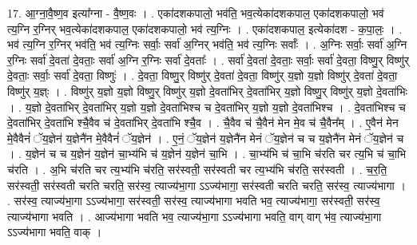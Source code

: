 \documentclass[17pt]{extarticle}
\begin{document}
17. आ॒ग्ना॒वै॒ष्ण॒व इत्या᳚ग्ना - वै॒ष्ण॒वः । . एका॑दशकपालो॒ भव॑ति॒ भव॒त्येका॑दशकपाल॒ एका॑दशकपालो॒ भव॑ त्य॒ग्नि र॒ग्निर् भव॒त्येका॑दशकपाल॒ एका॑दशकपालो॒ भव॑ त्य॒ग्निः । . एका॑दशकपाल॒ इत्येका॑दश - क॒पा॒लः॒ । . भव॑ त्य॒ग्नि र॒ग्निर् भव॑ति॒ भव॑ त्य॒ग्निः सर्वाः॒ सर्वा॑ अ॒ग्निर् भव॑ति॒ भव॑ त्य॒ग्निः सर्वाः᳚ । . अ॒ग्निः सर्वाः॒ सर्वा॑ अ॒ग्नि र॒ग्निः सर्वा॑ दे॒वता॑ दे॒वताः॒ सर्वा॑ अ॒ग्नि र॒ग्निः सर्वा॑ दे॒वताः᳚ । . सर्वा॑ दे॒वता॑ दे॒वताः॒ सर्वाः॒ सर्वा॑ दे॒वता॒ विष्णु॒र् विष्णु॑र् दे॒वताः॒ सर्वाः॒ सर्वा॑ दे॒वता॒ विष्णुः॑ । . दे॒वता॒ विष्णु॒र् विष्णु॑र् दे॒वता॑ दे॒वता॒ विष्णु॑र् य॒ज्ञो य॒ज्ञो विष्णु॑र् दे॒वता॑ दे॒वता॒ विष्णु॑र् य॒ज्ञ्ः । . विष्णु॑र् य॒ज्ञो य॒ज्ञो विष्णु॒र् विष्णु॑र् य॒ज्ञो दे॒वता॑भिर् दे॒वता॑भिर् य॒ज्ञो विष्णु॒र् विष्णु॑र् य॒ज्ञो दे॒वता॑भिः । . य॒ज्ञो दे॒वता॑भिर् दे॒वता॑भिर् य॒ज्ञो य॒ज्ञो दे॒वता॑भिश्च च दे॒वता॑भिर् य॒ज्ञो य॒ज्ञो दे॒वता॑भिश्च । . दे॒वता॑भिश्च च दे॒वता॑भिर् दे॒वता॑भि श्चै॒वैव च॑ दे॒वता॑भिर् दे॒वता॑भि श्चै॒व । . चै॒वैव च॑ चै॒वैन॑ मेन मे॒व च॑ चै॒वैन᳚म् । . ए॒वैन॑ मेन मे॒वैवैनं॑ ॅय॒ज्ञेन॑ य॒ज्ञेनै॑न मे॒वैवैनं॑ ॅय॒ज्ञेन॑ । . ए॒नं॒ ॅय॒ज्ञेन॑ य॒ज्ञेनै॑न मेनं ॅय॒ज्ञेन॑ च च य॒ज्ञेनै॑न मेनं ॅय॒ज्ञेन॑ च । . य॒ज्ञेन॑ च च य॒ज्ञेन॑ य॒ज्ञेन॑ चा॒भ्य॑भि च॑ य॒ज्ञेन॑ य॒ज्ञेन॑ चा॒भि । . चा॒भ्य॑भि च॑ चा॒भि च॑रति चर त्य॒भि च॑ चा॒भि च॑रति । . अ॒भि च॑रति चर त्य॒भ्य॑भि च॑रति॒ सर॑स्वती॒ सर॑स्वती चर त्य॒भ्य॑भि च॑रति॒ सर॑स्वती । . च॒र॒ति॒ सर॑स्वती॒ सर॑स्वती चरति चरति॒ सर॑स्व॒ त्याज्य॑भा॒गा ऽऽज्य॑भागा॒ सर॑स्वती चरति चरति॒ सर॑स्व॒ त्याज्य॑भागा । . सर॑स्व॒ त्याज्य॑भा॒गा ऽऽज्य॑भागा॒ सर॑स्वती॒ सर॑स्व॒ त्याज्य॑भागा भवति भव॒ त्याज्य॑भागा॒ सर॑स्वती॒ सर॑स्व॒ त्याज्य॑भागा भवति । . आज्य॑भागा भवति भव॒ त्याज्य॑भा॒गा ऽऽज्य॑भागा भवति॒ वाग् वाग् भ॑व॒ त्याज्य॑भा॒गा ऽऽज्य॑भागा भवति॒ वाक् । \newline
\end{document}
